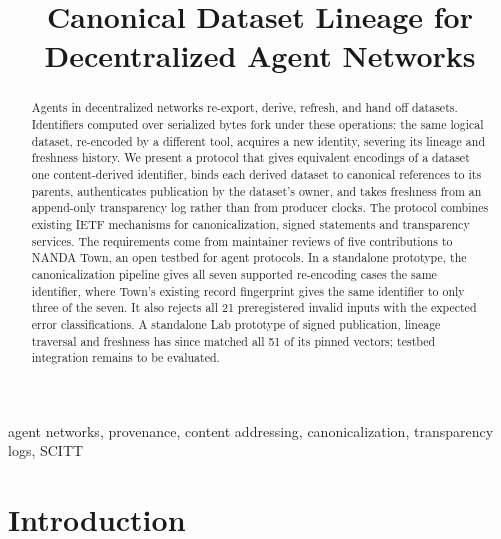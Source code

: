 \documentclass[conference]{IEEEtran}
\begin{document}
\title{Canonical Dataset Lineage for\\Decentralized Agent Networks}

\author{
}

\maketitle

\begin{abstract}
Agents in decentralized networks re-export, derive, refresh, and hand off datasets. Identifiers computed over serialized bytes fork under these operations: the same logical dataset, re-encoded by a different tool, acquires a new identity, severing its lineage and freshness history. We present a protocol that gives equivalent encodings of a dataset one content-derived identifier, binds each derived dataset to canonical references to its parents, authenticates publication by the dataset's owner, and takes freshness from an append-only transparency log rather than from producer clocks. The protocol combines existing IETF mechanisms for canonicalization, signed statements and transparency services. The requirements come from maintainer reviews of five contributions to NANDA Town, an open testbed for agent protocols. In a standalone prototype, the canonicalization pipeline gives all seven supported re-encoding cases the same identifier, where Town's existing record fingerprint gives the same identifier to only three of the seven. It also rejects all 21 preregistered invalid inputs with the expected error classifications. A standalone Lab prototype of signed publication, lineage traversal and freshness has since matched all 51 of its pinned vectors; testbed integration remains to be evaluated.
\end{abstract}

\begin{IEEEkeywords}
agent networks, provenance, content addressing, canonicalization, transparency logs, SCITT
\end{IEEEkeywords}

\section{Introduction}
\end{document}
